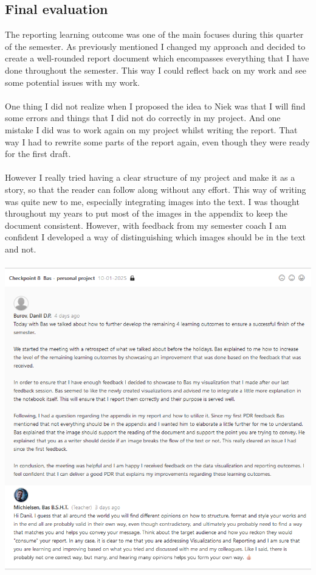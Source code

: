 \documentclass{article}
\begin{document}
\subsection{Final evaluation}
The reporting learning outcome was one of the main focuses during this quarter of the semester. As previously mentioned I changed my approach and decided to create a well-rounded report document which encompasses everything that I have done throughout the semester. This way I could reflect back on my work and see some potential issues with my work.\\\\
One thing I did not realize when I proposed the idea to Niek was that I will find some errors and things that I did not do correctly in my project. And one mistake I did was to work again on my project whilst writing the report. That way I had to rewrite some parts of the report again, even though they were ready for the first draft.\\\\
However I really tried having a clear structure of my project and make it as a story, so that the reader can follow along without any effort. This way of writing was quite new to me, especially integrating images into the text. I was thought throughout my years to put most of the images in the appendix to keep the document consistent. However, with feedback from my semester coach I am confident I developed a way of distinguishing which images should be in the text and not.\\\\
\includegraphics[width=\textwidth,keepaspectratio]{images/Feedback_Bas_4.png}\\\\
\end{document}
